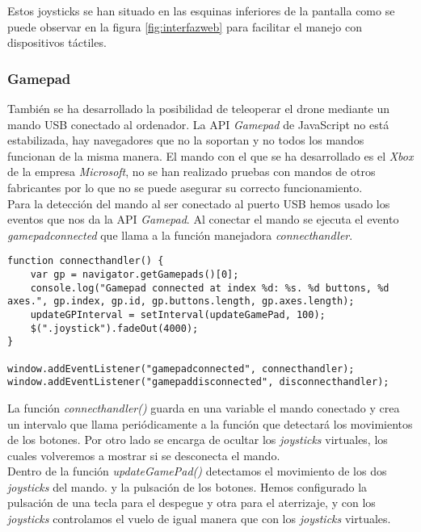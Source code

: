 Estos joysticks se han situado en las esquinas inferiores de la pantalla como se puede observar en la figura \ref{fig:interfazweb} para facilitar el manejo con dispositivos táctiles.\\

\subsubsection{Gamepad}

También se ha desarrollado la posibilidad de teleoperar el drone mediante un mando USB conectado al ordenador. La API \emph{Gamepad} de JavaScript no está estabilizada, hay navegadores que no la soportan y no todos los mandos funcionan de la misma manera. El mando con el que se ha desarrollado es el \emph{Xbox} de la empresa \emph{Microsoft}, no se han realizado pruebas con mandos de otros fabricantes por lo que no se puede asegurar su correcto funcionamiento. \\

Para la detección del mando al ser conectado al puerto USB hemos usado los eventos que nos da la API \emph{Gamepad}. Al conectar el mando se ejecuta el evento \emph{gamepadconnected} que llama a la función manejadora \emph{connecthandler}.\\

\begin{lstlisting}[caption=Detección del mando.]
function connecthandler() {
    var gp = navigator.getGamepads()[0];
    console.log("Gamepad connected at index %d: %s. %d buttons, %d axes.", gp.index, gp.id, gp.buttons.length, gp.axes.length);
    updateGPInterval = setInterval(updateGamePad, 100);
    $(".joystick").fadeOut(4000);
}

window.addEventListener("gamepadconnected", connecthandler);
window.addEventListener("gamepaddisconnected", disconnecthandler);
\end{lstlisting}

La función \emph{connecthandler()} guarda en una variable el mando conectado y crea un intervalo que llama periódicamente a la función que detectará los movimientos de los botones. Por otro lado se encarga de ocultar los \emph{joysticks} virtuales, los cuales volveremos a mostrar si se desconecta el mando.\\

Dentro de la función \emph{updateGamePad()} detectamos el movimiento de los dos \emph{joysticks} del mando. y la pulsación de los botones. Hemos configurado la pulsación de una tecla para el despegue y otra para el aterrizaje, y con los \emph{joysticks} controlamos el vuelo de igual manera que con los \emph{joysticks} virtuales.\\

